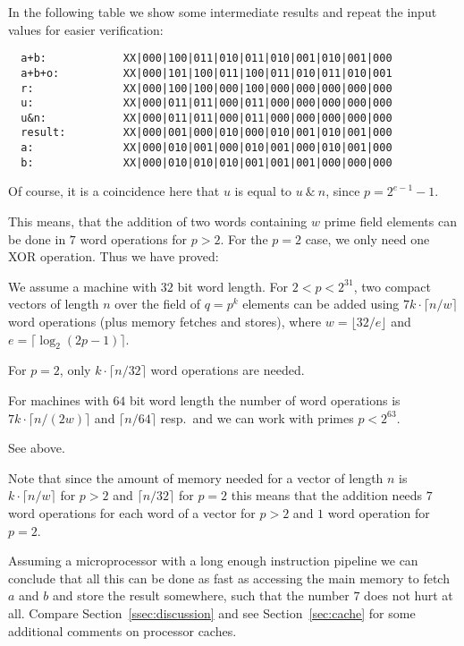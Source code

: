 In the following table we show some intermediate results and repeat
the input values for easier verification:

\begin{verbatim}
  a+b:            XX|000|100|011|010|011|010|001|010|001|000
  a+b+o:          XX|000|101|100|011|100|011|010|011|010|001
  r:              XX|000|100|100|000|100|000|000|000|000|000
  u:              XX|000|011|011|000|011|000|000|000|000|000
  u&n:            XX|000|011|011|000|011|000|000|000|000|000
  result:         XX|000|001|000|010|000|010|001|010|001|000
  a:              XX|000|010|001|000|010|001|000|010|001|000
  b:              XX|000|010|010|010|001|001|001|000|000|000
\end{verbatim}

Of course, it is a coincidence here that $u$ is equal to 
$u \ \&\ n$, since $p = 2^{e-1}-1$.

This means, that the addition of two words containing $w$ prime field
elements can be done in $7$ word operations for $p > 2$. For the
$p=2$ case, we only need one XOR operation. Thus we have proved:

\begin{Prop}
\label{addvec}
We assume a machine with $32$ bit word length. For $2 < p < 2^{31}$,
two compact vectors of length $n$ over the field of $q=p^k$
elements can be added using $7k\cdot \lceil n/w \rceil$ word operations
(plus memory fetches and stores), where $w = \lfloor 32/e \rfloor$
and $e = \lceil \log_2(2p-1) \rceil$. 

For $p=2$, only $k \cdot \lceil n/32 \rceil$ word operations are needed.

For machines with $64$ bit word length the number of word operations
is $7k \cdot \lceil n/(2w) \rceil$ and $\lceil n/64 \rceil$ resp.~and 
we can work with primes $p < 2^{63}$.
\end{Prop}
\Proof See above. \ProofEnd

\begin{Rem}
Note that since the amount of memory needed for a vector of length $n$
is $k \cdot \lceil n/w \rceil$ for $p > 2$ and $\lceil n/32 \rceil$ for
$p=2$ this means that the addition needs $7$ word operations for each
word of a vector for $p>2$ and $1$ word operation for $p=2$.

Assuming a microprocessor
with a long enough instruction pipeline we can conclude that all this
can be done as fast as accessing the main memory to fetch $a$ and $b$ and
store the result somewhere, such that the number $7$ does not hurt at all. 
Compare Section~\ref{ssec:discussion} and see Section~\ref{sec:cache}
for some additional comments on processor caches.
\end{Rem}

